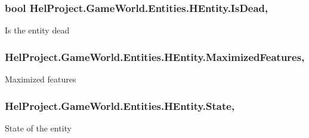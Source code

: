 \subsubsection[{Is\+Dead}]{\setlength{\rightskip}{0pt plus 5cm}bool Hel\+Project.\+Game\+World.\+Entities.\+H\+Entity.\+Is\+Dead\hspace{0.3cm}{\ttfamily [get]}, {\ttfamily [set]}}\label{class_hel_project_1_1_game_world_1_1_entities_1_1_h_entity_a5ca32a01d263b7bc52df0f2458f5fe06}


Is the entity dead 

\hypertarget{class_hel_project_1_1_game_world_1_1_entities_1_1_h_entity_afb7fd74a8073bf8311bceba415e6022c}{}
\subsubsection[{Maximized\+Features}]{ Hel\+Project.\+Game\+World.\+Entities.\+H\+Entity.\+Maximized\+Features\hspace{0.3cm}{\ttfamily [get]}, {\ttfamily [set]}}\label{class_hel_project_1_1_game_world_1_1_entities_1_1_h_entity_afb7fd74a8073bf8311bceba415e6022c}


Maximized features 

\hypertarget{class_hel_project_1_1_game_world_1_1_entities_1_1_h_entity_a2e904ad6fe707cadd501a423e4768a0d}{}
\subsubsection[{State}]{ Hel\+Project.\+Game\+World.\+Entities.\+H\+Entity.\+State\hspace{0.3cm}{\ttfamily [get]}, {\ttfamily [set]}}\label{class_hel_project_1_1_game_world_1_1_entities_1_1_h_entity_a2e904ad6fe707cadd501a423e4768a0d}


State of the entity 

